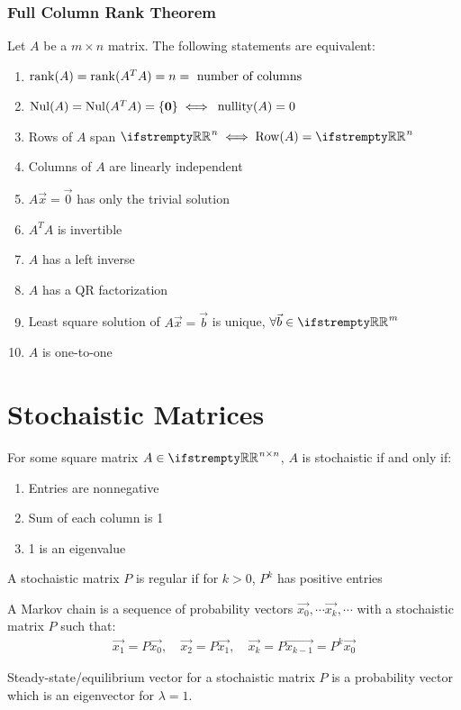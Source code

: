 \documentclass[12pt, a4paper]{article}
\begin{document}
\begin{multicols*}{3}
\subsubsection{Full Column Rank Theorem}
Let $A$ be a ${m\times n}$ matrix. The following statements are equivalent:
\begin{enumerate}[\roman*.]
  \item $\operatorname{rank}(A) = \operatorname{rank}(A^TA) = n = \text{ number of columns}$
  \item $\operatorname{Nul}(A) = \operatorname{Nul}(A^TA) = \{\mathbf{0}\} \iff$ $\operatorname{nullity}(A) = 0$
  \item Rows of $A$ span $\RR^n \iff \row(A) = \RR^n$ 
  \item Columns of $A$ are linearly independent
  \item $A\vec{x} = \vec{0}$ has only the trivial solution 
  \item $A^TA$ is invertible
  \item $A$ has a left inverse
  \item $A$ has a QR factorization
  \item Least square solution of $A \vec{x} = \vec{b}$ is unique, $\forall \vec{b}\in \RR^m$
  \item $A$ is one-to-one
\end{enumerate}

\section{Stochaistic Matrices}
For some square matrix $A \in \RR^{n{\times}n}$, $A$ is stochaistic if and only if:
\begin{enumerate}[\roman*.]
  \item Entries are nonnegative
  \item Sum of each column is 1 
  \item 1 is an eigenvalue
\end{enumerate}

A stochaistic matrix $P$ is regular if for $k > 0$, $P^k$ has positive entries

A Markov chain is a sequence of probability vectors $\vec{x_0}, \cdots \vec{x_k}, \cdots$ with a stochaistic matrix $P$ such that:
\begin{align*}
  \vec{x_1} = P \vec{x_0},\quad \vec{x_2}=P \vec{x_1},\quad \vec{x_k}=P \vec{x_{k-1}}=P^k \vec{x_0}
\end{align*}

Steady-state/equilibrium vector for a stochaistic matrix $P$ is a probability vector which is an eigenvector for $\lambda = 1$. 


\end{multicols*}
\end{document}
